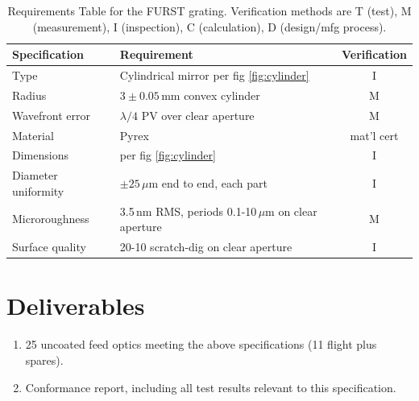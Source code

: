 \documentclass[12pt]{article}
\begin{document}
\begin{table}
\caption{Requirements Table for the FURST grating. Verification methods are T (test), 
   M (measurement), I (inspection), C (calculation), D (design/mfg process).}\label{tab:spec}
   \small
   \begin{tabular}{llc} \hline
      Specification     & Requirement                                     & Verification \\ \hline
      Type     & Cylindrical mirror per fig \ref{fig:cylinder}            & I \\
      Radius   & $3\pm 0.05$\,mm convex cylinder                          & M \\
      Wavefront error & $\lambda/4$ PV over clear aperture                & M \\
      Material & Pyrex                                                    & mat'l cert \\
      Dimensions & per fig \ref{fig:cylinder}                             & I \\
      Diameter uniformity & $\pm 25\,\mu$m end to end, each part          & I \\
      Microroughness & 3.5\,nm RMS, periods 0.1-10\,$\mu$m on clear aperture & M \\
      Surface quality & 20-10 scratch-dig on clear aperture & I \\ %
      \hline
   \end{tabular}
   \normalsize
\end{table}





\section{Deliverables} \label{sec:deliverables}
\begin{enumerate}
   \item 25 uncoated feed optics meeting the above specifications (11 flight plus spares).
   \item Conformance report, including all test results relevant to this specification.
\end{enumerate}
\end{document}
